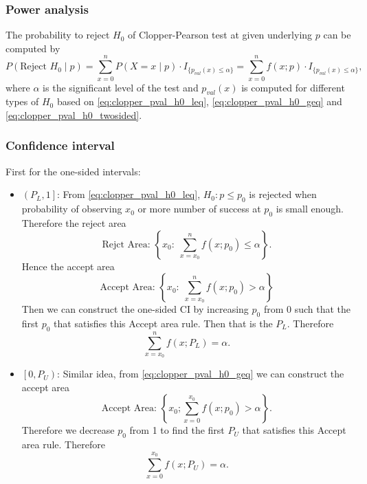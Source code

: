 \documentclass[a4paper,12pt]{article}
\begin{document}
\subsubsection{Power analysis}
\label{sec:power-analysis}

The probability to reject $H_0$ of Clopper-Pearson test at given underlying $p$ can be computed by
\begin{equation}
  \label{eq:clopper_power}
  P\left(\text{Reject } H_0\middle| p\right)
  = \sum\limits_{x = 0}^nP\left(X = x\middle|p\right)\cdot I_{\{p_{val}\left(x\right)\leq \alpha\}}
  = \sum\limits_{x = 0}^nf\left(x;p\right)\cdot I_{\{p_{val}\left(x\right)\leq \alpha\}}
  ,
\end{equation}
where $\alpha$ is the significant level of the test and $p_{val}\left(x\right)$ is computed for different types of $H_0$ based on \eqref{eq:clopper_pval_h0_leq}, \eqref{eq:clopper_pval_h0_geq} and \eqref{eq:clopper_pval_h0_twosided}.

\subsubsection{Confidence interval}
\label{sec:confidence-interval}

First for the one-sided intervals:

\begin{itemize}
\item $\left(P_L, 1\right]$: From \eqref{eq:clopper_pval_h0_leq}, $H_0: p \leq p_0$ is rejected when probability of observing $x_0$ or more number of success at $p_0$ is small enough. Therefore the reject area
  \[
    \text{Rejct Area: }
    \left\{
      x_0:\;\sum\limits_{x = x_0}^nf\left(x;p_0\right)\leq\alpha
    \right\}
    .
  \]
  Hence the accept area
  \[
    \text{Accept Area: }
    \left\{
      x_0:\;\sum\limits_{x = x_0}^nf\left(x;p_0\right) > \alpha
    \right\}
  \]
  Then we can construct the one-sided CI by increasing $p_0$ from 0 such that the first $p_0$ that satisfies this Accept area rule. Then that is the $P_L$. Therefore
  \begin{equation}
    \label{eq:one_sided_pl}
    \sum\limits_{x = x_0}^nf\left(x;P_L\right) = \alpha
    .    
  \end{equation}

\item $\left[0, P_U\right)$: Similar idea, from \eqref{eq:clopper_pval_h0_geq} we can construct the accept area
  \[
    \text{Accept Area: }
    \left\{
      x_0;\sum\limits_{x=0}^{x_0}f\left(x;p_0\right)>\alpha
    \right\}
    .
  \]
  Therefore we decrease $p_0$ from 1 to find the first $P_U$ that satisfies this Accept area rule. Therefore
  \begin{equation}
    \label{eq:one_sided_pu}
    \sum\limits_{x = 0}^{x_0}f\left(x;P_U\right) = \alpha
    .    
  \end{equation}
\end{itemize}
\end{document}
